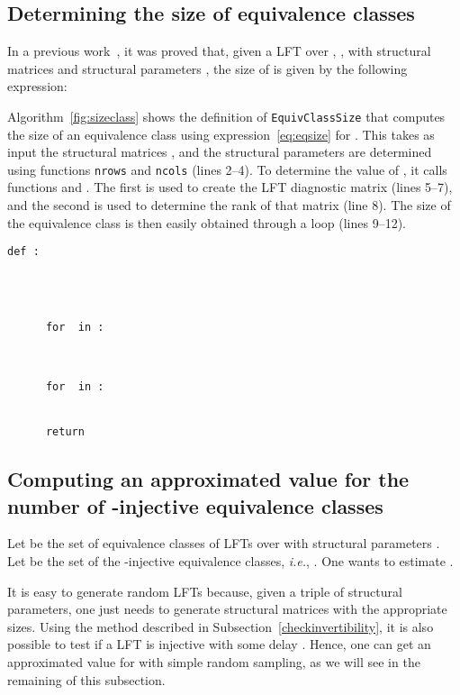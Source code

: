 \documentclass{ocg}
\newcommand{\LFT}{LFT}
\begin{document}
\subsection{Determining the size of equivalence
  classes}\label{sec:sizeEC}
In a previous work~\cite{AMRciaa14}, it was proved that, given a \LFT{} over , , with structural matrices  and structural parameters
, the size of  is given by the following expression:

Algorithm~\ref{fig:sizeclass} shows the definition of
\texttt{EquivClassSize} that computes the size of an equivalence class
using expression~\eqref{eq:eqsize} for . This takes as input the
structural matrices , and the structural parameters 
are determined using functions \texttt{nrows} and
\texttt{ncols} (lines 2--4). To determine the value of , it calls functions  and . The
first is used to create the \LFT{} diagnostic matrix (lines 5--7), and
the second is used to determine the rank of that matrix (line 8). The
size of the equivalence class is then easily obtained through a loop
(lines 9--12).
\begin{lstlisting}[caption={Determining the size of equivalence
    classes.},label={fig:sizeclass}]
  def :
      
       
      
      
      for  in :
          
      
      
      for  in :
          
      
      return 
\end{lstlisting}
\subsection{Computing an approximated value for the number of
  -injective equivalence classes}\label{sec:estimation}

Let  be the set of equivalence classes of \LFT{}s over  with
structural parameters . Let
 be the set of the
-injective equivalence classes, \textit{i.e.}, . One wants to estimate
.

It is easy to generate random \LFT{}s because, given a triple of structural
parameters, one just needs to generate structural matrices 
with the appropriate sizes. Using the method described in
Subsection~\ref{checkinvertibility}, it is also possible to test if a
\LFT{} is injective with some delay . Hence, one can get an approximated value for
 with simple
random sampling, as we will see in the remaining of this
subsection.
\end{document}
